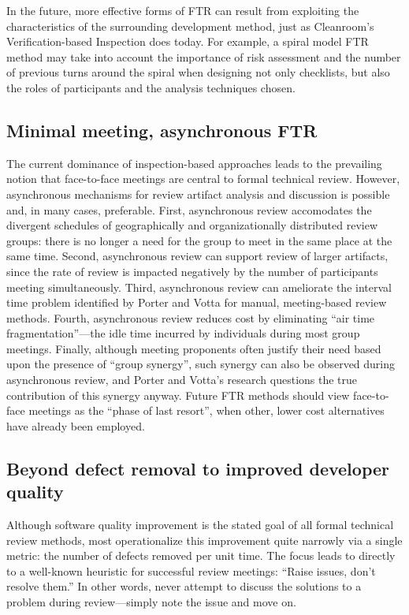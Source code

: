 In the future, more effective forms of FTR can result from exploiting the
characteristics of the surrounding development method, just as Cleanroom's
Verification-based Inspection does today.  For example, a spiral model FTR
method may take into account the importance of risk assessment and the
number of previous turns around the spiral when designing not only
checklists, but also the roles of participants and the analysis techniques
chosen.

\subsection*{Minimal meeting, asynchronous FTR}

The current dominance of inspection-based approaches leads to the
prevailing notion that face-to-face meetings are central to formal
technical review. However, asynchronous mechanisms for review artifact
analysis and discussion is possible and, in many cases, preferable.  First,
asynchronous review accomodates the divergent schedules of geographically
and organizationally distributed review groups: there is no longer a need
for the group to meet in the same place at the same time. Second,
asynchronous review can support review of larger artifacts, since the rate
of review is impacted negatively by the number of participants meeting
simultaneously.  Third, asynchronous review can ameliorate the interval
time problem identified by Porter and Votta for manual, meeting-based
review methods.  Fourth, asynchronous review reduces cost by eliminating
``air time fragmentation''---the idle time incurred by individuals during
most group meetings.  Finally, although meeting proponents often justify
their need based upon the presence of ``group synergy'', such synergy can
also be observed during asynchronous review, and Porter and Votta's
research questions the true contribution of this synergy anyway.  Future
FTR methods should view face-to-face meetings as the ``phase of last
resort'', when other, lower cost alternatives have already been employed.


\subsection*{Beyond defect removal to improved developer quality}

Although software quality improvement is the stated goal of all formal
technical review methods, most operationalize this improvement quite
narrowly via a single metric: the number of defects removed per unit time.
The focus leads to directly to a well-known heuristic for successful review
meetings: ``Raise issues, don't resolve them.''  In other words, never
attempt to discuss the solutions to a problem during review---simply note
the issue and move on.

